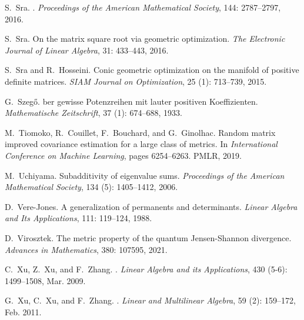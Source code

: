 \documentclass[11pt]{article}
\begin{document}
\begin{thebibliography}{33}
S.~Sra.
.
\newblock \emph{Proceedings of the American Mathematical Society},
  144: 2787--2797, 2016{}.

S.~Sra.
\newblock On the matrix square root via geometric optimization.
\newblock \emph{The Electronic Journal of Linear Algebra}, 31:
  433--443, 2016{}.

S.~Sra and R.~Hosseini.
\newblock Conic geometric optimization on the manifold of positive definite
  matrices.
\newblock \emph{SIAM Journal on Optimization}, 25 (1):
  713--739, 2015.

G.~Szeg\H{o}.
ber gewisse {P}otenzreihen mit lauter positiven {K}oeffizienten.
\newblock \emph{Mathematische Zeitschrift}, 37 (1): 674--688,
  1933.

M.~Tiomoko, R.~Couillet, F.~Bouchard, and G.~Ginolhac.
\newblock Random matrix improved covariance estimation for a large class of
  metrics.
\newblock In \emph{International Conference on Machine Learning}, pages
  6254--6263. PMLR, 2019.

M.~Uchiyama.
\newblock Subadditivity of eigenvalue sums.
\newblock \emph{Proceedings of the American Mathematical Society}, 134
  (5): 1405--1412, 2006.

D.~Vere-Jones.
\newblock A generalization of permanents and determinants.
\newblock \emph{Linear Algebra and Its Applications}, 111: 119--124,
  1988.

D.~Virosztek.
\newblock The metric property of the quantum {J}ensen-{S}hannon divergence.
\newblock \emph{Advances in Mathematics}, 380: 107595, 2021.

C.~Xu, Z.~Xu, and F.~Zhang.
.
\newblock \emph{Linear Algebra and its Applications}, 430
  (5-6): 1499--1508, Mar. 2009.

G.~Xu, C.~Xu, and F.~Zhang.
.
\newblock \emph{Linear and Multilinear Algebra}, 59 (2):
  159--172, Feb. 2011.


\end{thebibliography}
\end{document}
